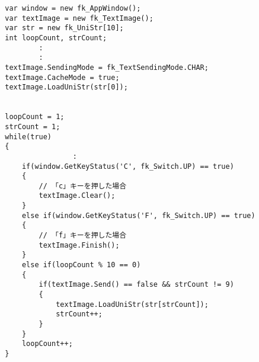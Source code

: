 \begin{breakbox}
\begin{verbatim}
        var window = new fk_AppWindow();
        var textImage = new fk_TextImage();
        var str = new fk_UniStr[10];
        int loopCount, strCount;
                :
                :
        textImage.SendingMode = fk_TextSendingMode.CHAR;
        textImage.CacheMode = true;
        textImage.LoadUniStr(str[0]);


        loopCount = 1;
        strCount = 1;
        while(true)
        {
                        :
            if(window.GetKeyStatus('C', fk_Switch.UP) == true)
            {
                // 「c」キーを押した場合
                textImage.Clear();
            }
            else if(window.GetKeyStatus('F', fk_Switch.UP) == true)
            {
                // 「f」キーを押した場合
                textImage.Finish();
            }
            else if(loopCount % 10 == 0)
            {
                if(textImage.Send() == false && strCount != 9)
                {
                    textImage.LoadUniStr(str[strCount]);
                    strCount++;
                }
            }
            loopCount++;
        }
\end{verbatim}
\end{breakbox}


